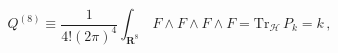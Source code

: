 \begin{equation}
 Q^{(8)}\equiv \frac{1}{4!(2\pi)^4}\int_{\mathbf{R}^8} 
 \,F\wedge F\wedge F\wedge F =\textrm{Tr}_{\mathcal{H}}\,P_k = k\,,
\label{eq:5.18}
\end{equation}

